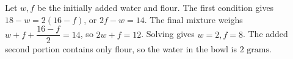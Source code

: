 Let $w,f$ be the initially added water and flour. The first condition gives $18-w=2(16-f)$, or $2f-w=14$. The final mixture weighs $w+f+\dfrac{16-f}{2}=14$, so $2w+f=12$. Solving gives $w=2,f=8$. The added second portion contains only flour, so the water in the bowl is $\boxed{2\text{ grams}}$.
